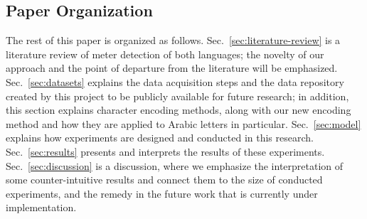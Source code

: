 \subsection{Paper Organization}\label{sec:paper-organization}
The rest of this paper is organized as follows. Sec.~\ref{sec:literature-review} is a literature
review of meter detection of both languages; the novelty of our approach and the point of departure
from the literature will be emphasized. Sec.~\ref{sec:datasets} explains the data acquisition steps
and the data repository created by this project to be publicly available for future research; in
addition, this section explains character encoding methods, along with our new encoding method and
how they are applied to Arabic letters in particular. Sec.~\ref{sec:model} explains how experiments
are designed and conducted in this research. Sec.~\ref{sec:results} presents and interprets the
results of these experiments. Sec.~\ref{sec:discussion} is a discussion, where we emphasize the
interpretation of some counter-intuitive results and connect them to the size of conducted
experiments, and the remedy in the future work that is currently under implementation.
